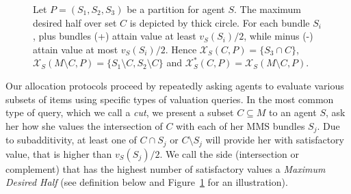 \begin{figure}
\begin{center}
\small{
    }
\end{center}

    \caption{Let  $P=(S_1,S_2,S_3)$ be a partition for agent $S$. The maximum desired half over set $C$ is depicted by thick circle. For each bundle $S_i$, plus bundles (+) attain value at least  $v_S(S_i)/2$, while minus (-) attain value at most $v_S(S_i)/2$. Hence  $\mathcal{X}_{S}(C,P)=\{S_3\cap C\}$, $\mathcal{X}_{S}({M\setminus C},P)=\{S_1\setminus C,S_2 \setminus C \}$ and $\mathcal{X}^*_{S}(C,P)=\mathcal{X}_{S}({M\setminus C},P)$.}
\label{fig:maximumCut}
\end{figure}
Our allocation protocols proceed by repeatedly asking agents to
evaluate various subsets of items using specific types of valuation
queries. In the most common type of query, which we call a {\em cut}, we
present a subset $C\subseteq M$ to an agent $S$, ask her how she values
the intersection of $C$ with each of her MMS bundles $S_j$. Due to
subadditivity, at least one of $C\cap S_j$ or $C\setminus S_j$ will provide her
with satisfactory value, that is higher than $v_S(S_j)/2$. We call the side (intersection or complement) that has the highest number of satisfactory values a {\em Maximum
  Desired Half} (see definition below and Figure~\ref{fig:maximumCut} for an illustration).

